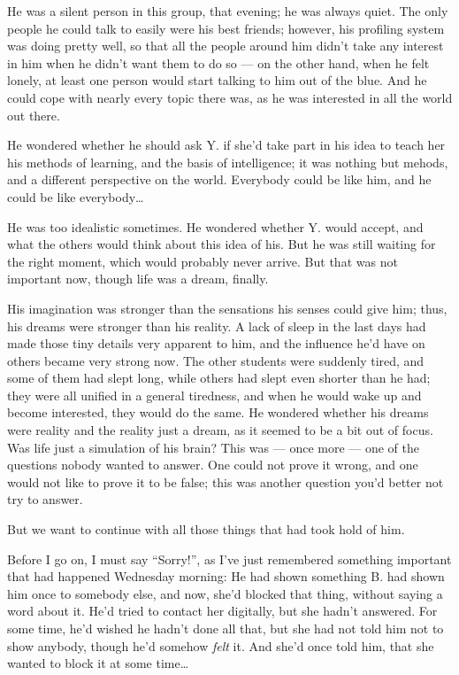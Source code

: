 He was a silent person in this group, that evening; he was always quiet. The only people he could talk to easily were his best friends; however, his profiling system was doing pretty well, so that all the people around him didn't take any interest in him when he didn't want them to do so --- on the other hand, when he felt lonely, at least one person would start talking to him out of the blue. And he could cope with nearly every topic there was, as he was interested in all the world out there.

He wondered whether he should ask Y. if she'd take part in his idea to teach her his methods of learning, and the basis of intelligence; it was nothing but mehods, and a different perspective on the world. Everybody could be like him, and he could be like everybody\dots{}

He was too idealistic sometimes. He wondered whether Y. would accept, and what the others would think about this idea of his. But he was still waiting for the right moment, which would probably never arrive.
But that was not important now, though life was a dream, finally.

His imagination was stronger than the sensations his senses could give him; thus, his dreams were stronger than his reality. A lack of sleep in the last days had made those tiny details very apparent to him, and the influence he'd have on others became  very strong now. The other students were suddenly tired, and some of them had slept long, while others had slept even shorter than he had; they were all unified in a general tiredness, and when he would wake up and become interested, they would do the same. He wondered whether his dreams were reality and the reality just a dream, as it seemed to be a bit out of focus. Was life just a simulation of his brain? This was --- once more --- one of the questions nobody wanted to answer. One could not prove it wrong, and one would not like to prove it to be false; this was another question you'd better not try to answer.

But we want to continue with all those things that had took hold of him.

Before I go on, I must say \enquote{Sorry!}, as I've just remembered something important that had happened Wednesday morning: He had shown something B. had shown him once to somebody else, and now, she'd blocked that thing, without saying a word about it. He'd tried to contact her digitally, but she hadn't answered. For some time, he'd wished he hadn't done all that, but she had not told him not to show anybody, though he'd somehow \emph{felt} it. And she'd once told him, that she wanted to block it at some time\dots{}

